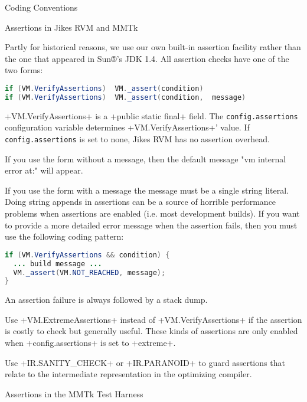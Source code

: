 \begin{section}{Coding Conventions}
\label{sec:codingconventions}

\begin{subsection}{Assertions in Jikes RVM and MMTk}

Partly for historical reasons, we use our own built-in assertion facility rather than the one that appeared in Sun®'s JDK 1.4. All assertion checks have one of the two forms:

\begin{lstlisting}[language=Java]
if (VM.VerifyAssertions)  VM._assert(condition)
if (VM.VerifyAssertions)  VM._assert(condition,  message)
\end{lstlisting}

\spverb+VM.VerifyAssertions+ is a \spverb+public static final+ field. The \texttt{con\-fig.as\-ser\-tions} configuration variable determines \spverb+VM.VerifyAssertions+' value. If \texttt{con\-fig.as\-ser\-tions} is set to none, Jikes RVM has no assertion overhead.

If you use the form without a message, then the default message "vm internal error at:" will appear.

If you use the form with a message the message must be a single string literal. Doing string appends in assertions can be a source of horrible performance problems when assertions are enabled (i.e. most development builds). If you want to provide a more detailed error message when the assertion fails, then you must use the following coding pattern:

\begin{lstlisting}[language=Java]
if (VM.VerifyAssertions && condition) {
  ... build message ...
  VM._assert(VM.NOT_REACHED, message);
}
\end{lstlisting}

An assertion failure is always followed by a stack dump.

Use \spverb+VM.ExtremeAssertions+ instead of \spverb+VM.VerifyAssertions+ if the assertion is costly to check but generally useful. These kinds of assertions are only enabled when \spverb+config.assertions+ is set to \spverb+extreme+.

Use \spverb+IR.SANITY_CHECK+ or \spverb+IR.PARANOID+ to guard assertions that relate to the intermediate representation in the optimizing compiler.

\end{subsection}

\begin{subsection}{Assertions in the MMTk Test Harness}


\end{subsection}
\end{section}
